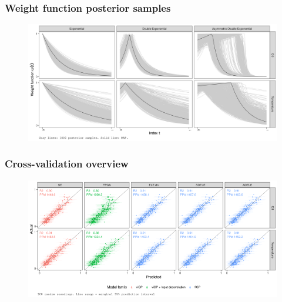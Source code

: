 \documentclass[aspectratio=169,t]{beamer}
\begin{document}
\begin{frame}
  \frametitle{Weight function posterior samples}

  \begin{figure}
    \centering
    \includegraphics[width=1\textwidth]{fit-full-posterior-weights-selected.png}
  \end{figure}
\end{frame}

\begin{frame}
  \frametitle{Cross-validation overview}

  \begin{figure}
    \centering
    \includegraphics[width=1\textwidth]{xvalidation-actual-predicted-scatterplot-selected}
  \end{figure}
\end{frame}
\end{document}
